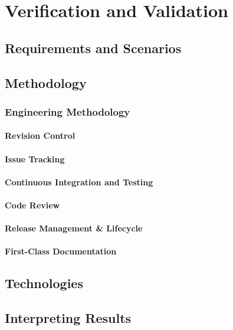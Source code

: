 \chapter{Verification and Validation}
\label{chapter:v_and_v}

\section{Requirements and Scenarios}
\section{Methodology}

\subsection{Engineering Methodology}

\subsubsection{Revision Control}

\subsubsection{Issue Tracking}

\subsubsection{Continuous Integration and Testing}

\subsubsection{Code Review}

\subsubsection{Release Management \& Lifecycle}

\subsubsection{First-Class Documentation}

\section{Technologies}
\section{Interpreting Results}
